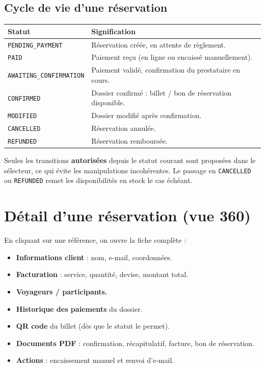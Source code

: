 \documentclass[11pt,a4paper]{article}
\newcommand{\etat}[1]{\textcolor{taNavy}{\texttt{#1}}}
\begin{document}
\subsection{Cycle de vie d'une réservation}
\begin{center}
\begin{longtable}{>{\raggedright}p{4.2cm} p{9cm}}
\toprule
\textbf{Statut} & \textbf{Signification} \\
\midrule
\endhead
\etat{PENDING\_PAYMENT} & Réservation créée, en attente de règlement. \\
\etat{PAID} & Paiement reçu (en ligne ou encaissé manuellement). \\
\etat{AWAITING\_CONFIRMATION} & Paiement validé, confirmation du prestataire en cours. \\
\etat{CONFIRMED} & Dossier confirmé : billet / bon de réservation disponible. \\
\etat{MODIFIED} & Dossier modifié après confirmation. \\
\etat{CANCELLED} & Réservation annulée. \\
\etat{REFUNDED} & Réservation remboursée. \\
\bottomrule
\end{longtable}
\end{center}

\begin{attention}
Seules les transitions \textbf{autorisées} depuis le statut courant sont proposées dans le
sélecteur, ce qui évite les manipulations incohérentes. Le passage en \etat{CANCELLED} ou
\etat{REFUNDED} remet les disponibilités en stock le cas échéant.
\end{attention}

\section{Détail d'une réservation (vue 360\textdegree)}
En cliquant sur une référence, on ouvre la fiche complète :
\begin{itemize}[leftmargin=1.4em]
  \item \textbf{Informations client} : nom, e-mail, coordonnées.
  \item \textbf{Facturation} : service, quantité, devise, montant total.
  \item \textbf{Voyageurs / participants.}
  \item \textbf{Historique des paiements} du dossier.
  \item \textbf{QR code} du billet (dès que le statut le permet).
  \item \textbf{Documents PDF} : confirmation, récapitulatif, facture, bon de réservation.
  \item \textbf{Actions} : encaissement manuel et renvoi d'e-mail.
\end{itemize}
\end{document}
